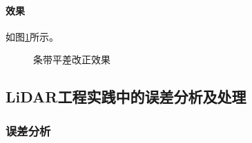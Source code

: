 \paragraph{效果}如图\ref{fig:条带平差改正效果}所示。
\begin{figure}[htbp]
	\centering
	\caption{条带平差改正效果}
	\label{fig:条带平差改正效果}
\end{figure}

\subsection{LiDAR工程实践中的误差分析及处理}
\subsubsection{误差分析}


